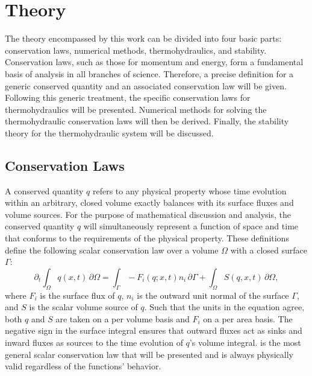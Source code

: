 \documentclass[Prelim,12pt]{WisconsinThesis}
\newcommand{\pdt}{\partial_t}
\newcommand{\V}  {\ensuremath{\Omega}}
\newcommand{\dV} {\,\partial\V}
\newcommand{\IntV} {\int_{\V}}
\renewcommand{\S}  {\ensuremath{\Gamma}}
\newcommand{\dS} {\,\partial\S}
\newcommand{\IntS} {\int_{\S}}
\newcommand{\q}{\ensuremath{q}}
\begin{document}
\chapter{Theory}

The theory encompassed by this work can be divided into four basic parts: conservation laws, numerical methods, thermohydraulics, and stability.
Conservation laws, such as those for momentum and energy, form a fundamental basis of analysis in all branches of science.
Therefore, a precise definition for a generic conserved quantity and an associated conservation law will be given.
Following this generic treatment, the specific conservation laws for thermohydraulics will be presented.
Numerical methods for solving the thermohydraulic conservation laws will then be derived.
Finally, the stability theory for the thermohydraulic system will be discussed.

\section{Conservation Laws}
A conserved quantity \q{} refers to any physical property whose time evolution within an arbitrary, closed volume exactly balances with its surface fluxes and volume sources. %
For the purpose of mathematical discussion and analysis, the conserved quantity \q{} will simultaneously represent a function of space and time that conforms to the requirements of the physical property.
These definitions define the following scalar conservation law over a volume \V{} with a closed surface \S{}:%
\begin{equation}%
    \pdt \IntV \q(x,t) \dV = \IntS -F_i(q;x,t) n_i\dS + \IntV S(q,x,t) \dV,
    \label{Eqn:GeneralIntegralCLaw}
\end{equation}
where $F_i$ is the surface flux of \q{}, $n_i$ is the outward unit normal of the surface \S{}, and $S$ is the scalar volume source of \q{}.
Such that the units in the equation agree, both \q{} and $S$ are taken on a per volume basis and $F_i$ on a per area basis.
The negative sign in the surface integral ensures that outward fluxes act as sinks and inward fluxes as sources to the time evolution of \q{}'s volume integral.
 is the most general scalar conservation law that will be presented and is always physically valid regardless of the functions' behavior.
\end{document}
